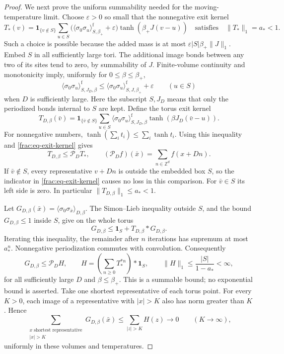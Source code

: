 \documentclass[11pt]{article}
\begin{document}
\begin{proof}
We next prove the uniform summability needed for the moving-temperature
limit. Choose \(\varepsilon>0\) so small that the nonnegative
exit kernel
\begin{equation}\label{frac:eq-exit-kernel}
 T_*(v)=\boldsymbol1_{\{v\notin S\}}
   \sum_{u\in S}
   \bigl(\langle\sigma_0\sigma_u\rangle^{\mathrm f}_{S,\beta_+}
                    +\varepsilon\bigr)
       \tanh(\beta_+J(v-u))
 \quad\text{satisfies}\quad \|T_*\|_1=a_*<1.
\end{equation}
Such a choice is possible because the added mass is at most
\(\varepsilon |S|\beta_+\|J\|_1\).
Embed \(S\) in all sufficiently large tori. The additional image
bonds between any two of its sites tend to zero, by summability
of \(J\). Finite-volume continuity and monotonicity imply,
uniformly for \(0\le\beta\le\beta_+\),
\[
 \langle\sigma_0\sigma_u\rangle^{\mathrm f}_{S,J_D,\beta}
 \le \langle\sigma_0\sigma_u\rangle^{\mathrm f}_{S,J,\beta_+}
                      +\varepsilon\qquad(u\in S)
\]
when \(D\) is sufficiently large. Here the subscript \(S,J_D\)
means that only the periodized bonds internal to \(S\) are kept.
Define the torus exit kernel
\[
 T_{D,\beta}(\bar v)=\boldsymbol1_{\{\bar v\notin S\}}
 \sum_{u\in S}
  \langle\sigma_0\sigma_u\rangle^{\mathrm f}_{S,J_D,\beta}
                         \tanh(\beta J_D(\bar v-u)).
\]
For nonnegative numbers, \(\tanh(\sum_i t_i)\le\sum_i\tanh t_i\).
Using this inequality and \eqref{frac:eq-exit-kernel} gives
\[
 T_{D,\beta}\le\mathcal P_DT_* ,\qquad
 (\mathcal P_Df)(\bar x)=\sum_{n\in\mathbb Z^d}f(x+Dn).
\]
If \(\bar v\notin S\), every representative \(v+Dn\) is
outside the embedded box \(S\), so the indicator in
\eqref{frac:eq-exit-kernel} causes no loss in this comparison.
For \(\bar v\in S\) its left side is zero.
In particular \(\|T_{D,\beta}\|_1\le a_*<1\).

Let \(G_{D,\beta}(\bar x)=
\langle\sigma_0\sigma_{\bar x}\rangle_{D,\beta}\).
The Simon--Lieb inequality outside \(S\), and the bound
\(G_{D,\beta}\le1\) inside \(S\), give on the whole torus
\[
 G_{D,\beta}\le\boldsymbol1_S+T_{D,\beta}*G_{D,\beta}.
\]
Iterating this inequality, the remainder after \(n\) iterations
has supremum at most \(a_*^n\). Nonnegative periodization
commutes with convolution. Consequently
\begin{equation}\label{frac:eq-renewal-envelope}
 G_{D,\beta}\le\mathcal P_DH,\qquad
 H=\left(\sum_{n\ge0}T_*^{*n}\right)*\boldsymbol1_S,
 \qquad \|H\|_1\le\frac{|S|}{1-a_*}<\infty,
\end{equation}
for all sufficiently large \(D\) and \(\beta\le\beta_+\).
This is a summable bound; no exponential bound is asserted.
Take one shortest representative of each torus point. For every
\(K>0\), each image of a representative with \(|x|>K\) also
has norm greater than \(K\). Hence
\[
 \sum_{\substack{x\text{ shortest representative}\\|x|>K}}
       G_{D,\beta}(\bar x)
 \le\sum_{|z|>K}H(z)\longrightarrow0
       \qquad(K\to\infty),
\]
uniformly in these volumes and temperatures.


\end{proof}
\end{document}
